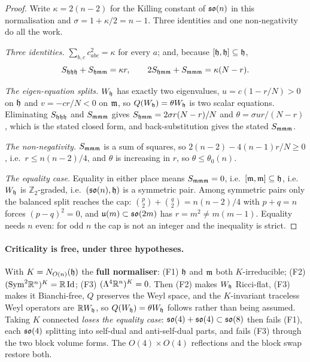\begin{proof}
Write $\kappa=2(n-2)$ for the Killing constant of $\mathfrak{so}(n)$ in this normalisation and $\sigma=1+\kappa/2=n-1$. Three identities and one non-negativity do all the work.

\emph{Three identities.} $\sum_{b,c}c_{abc}^2=\kappa$ for every $a$; and, because $[\mathfrak{h},\mathfrak{h}]\subseteq\mathfrak{h}$,
\[
S_{\mathfrak{h}\mathfrak{h}\mathfrak{h}}+S_{\mathfrak{h}\mathfrak{m}\mathfrak{m}}=\kappa r,\qquad 2S_{\mathfrak{h}\mathfrak{m}\mathfrak{m}}+S_{\mathfrak{m}\mathfrak{m}\mathfrak{m}}=\kappa(N-r).
\]

\emph{The eigen-equation splits.} $W_{\mathfrak{h}}$ has exactly two eigenvalues, $u=c(1-r/N)>0$ on $\mathfrak{h}$ and $v=-cr/N<0$ on $\mathfrak{m}$, so $Q(W_{\mathfrak{h}})=\theta W_{\mathfrak{h}}$ is two scalar equations. Eliminating $S_{\mathfrak{h}\mathfrak{h}\mathfrak{h}}$ and $S_{\mathfrak{m}\mathfrak{m}\mathfrak{m}}$ gives $S_{\mathfrak{h}\mathfrak{m}\mathfrak{m}}=2\sigma r(N-r)/N$ and $\theta=\sigma ur/(N-r)$, which is the stated closed form, and back-substitution gives the stated $S_{\mathfrak{m}\mathfrak{m}\mathfrak{m}}$.

\emph{The non-negativity.} $S_{\mathfrak{m}\mathfrak{m}\mathfrak{m}}$ is a sum of squares, so $2(n-2)-4(n-1)r/N\ge0$, i.e.\ $r\le n(n-2)/4$, and $\theta$ is increasing in $r$, so $\theta\le\theta_0(n)$.

\emph{The equality case.} Equality in either place means $S_{\mathfrak{m}\mathfrak{m}\mathfrak{m}}=0$, i.e.\ $[\mathfrak{m},\mathfrak{m}]\subseteq\mathfrak{h}$, i.e.\ $W_{\mathfrak{h}}$ is $\mathbb Z_2$-graded, i.e.\ $(\mathfrak{so}(n),\mathfrak{h})$ is a symmetric pair. Among symmetric pairs only the balanced split reaches the cap: $\binom p2+\binom q2=n(n-2)/4$ with $p+q=n$ forces $(p-q)^2=0$, and $\mathfrak{u}(m)\subset\mathfrak{so}(2m)$ has $r=m^2\ne m(m-1)$. Equality needs $n$ even: for odd $n$ the cap is not an integer and the inequality is strict.
\end{proof}

\paragraph{Criticality is free, under three hypotheses.} With $K=N_{O(n)}(\mathfrak{h})$ the \textbf{full normaliser}: (F1) $\mathfrak{h}$ and $\mathfrak{m}$ both $K$-irreducible; (F2) $(\mathrm{Sym}^2\mathbb{R}^n)^K=\mathbb{R}\,\mathrm{Id}$; (F3) $(\Lambda^4\mathbb{R}^n)^K=0$. Then (F2) makes $W_{\mathfrak{h}}$ Ricci-flat, (F3) makes it Bianchi-free, $Q$ preserves the Weyl space, and the $K$-invariant traceless Weyl operators are $\mathbb{R} W_{\mathfrak{h}}$, so $Q(W_{\mathfrak{h}})=\theta W_{\mathfrak{h}}$ follows rather than being assumed. Taking $K$ connected \emph{loses the equality case}: $\mathfrak{so}(4)+\mathfrak{so}(4)\subset\mathfrak{so}(8)$ then fails (F1), each $\mathfrak{so}(4)$ splitting into self-dual and anti-self-dual parts, and fails (F3) through the two block volume forms. The $O(4)\times O(4)$ reflections and the block swap restore both.

